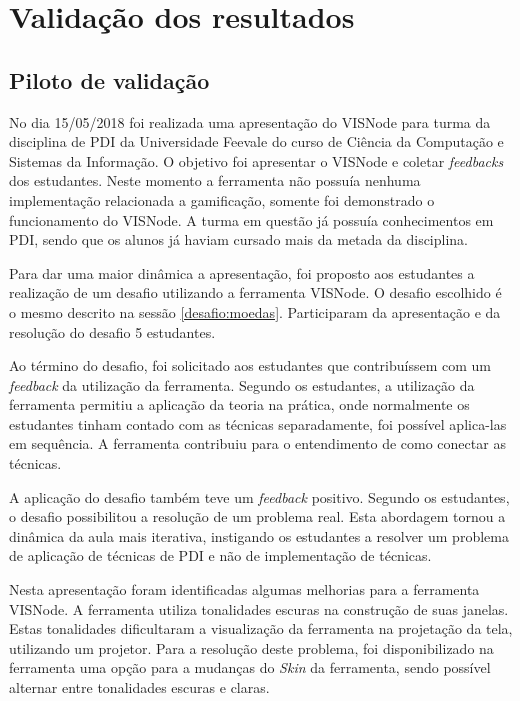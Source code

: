 \documentclass[
	12pt,				%
	oneside,			%
	a4paper,			%
	english,			%
	french,				%
	spanish,			%
	brazil,				%
	]{abntex2}
\begin{document}
\chapter{Validação dos resultados}

\section{Piloto de validação}
\label{validacao:piloto1}

No dia 15/05/2018 foi realizada uma apresentação do VISNode para turma da disciplina de PDI da Universidade Feevale do curso de Ciência da Computação e Sistemas da Informação. O objetivo  foi apresentar o VISNode e coletar \textit{feedbacks} dos estudantes. Neste momento a ferramenta não possuía nenhuma implementação relacionada a gamificação, somente foi demonstrado o funcionamento do VISNode. A turma em questão já possuía conhecimentos em PDI, sendo que os alunos já haviam cursado mais da metada da disciplina.

Para dar uma maior dinâmica a apresentação, foi proposto aos estudantes a realização de um desafio utilizando a ferramenta VISNode. O desafio escolhido é o mesmo descrito na sessão \ref{desafio:moedas}. Participaram da apresentação e da resolução do desafio 5 estudantes.

Ao término do desafio, foi solicitado aos estudantes que contribuíssem com um \textit{feedback} da utilização da ferramenta. Segundo os estudantes, a utilização da ferramenta permitiu a aplicação da teoria na prática, onde normalmente os estudantes tinham contado com as técnicas separadamente, foi possível aplica-las em sequência. A ferramenta contribuiu para o entendimento de como conectar as técnicas.

A aplicação do desafio também teve um \textit{feedback} positivo. Segundo os estudantes, o desafio possibilitou a resolução de um problema real. Esta abordagem tornou a dinâmica da aula mais iterativa, instigando os estudantes a resolver um problema de aplicação de técnicas de PDI e não de implementação de técnicas.

Nesta apresentação foram identificadas algumas melhorias para a ferramenta VISNode. A ferramenta utiliza tonalidades escuras na construção de suas janelas. Estas tonalidades dificultaram a visualização da ferramenta na projetação da tela, utilizando um projetor. Para a resolução deste problema, foi disponibilizado na ferramenta uma opção para a mudanças do \textit{Skin} da ferramenta, sendo possível alternar entre tonalidades escuras e claras.
\end{document}

